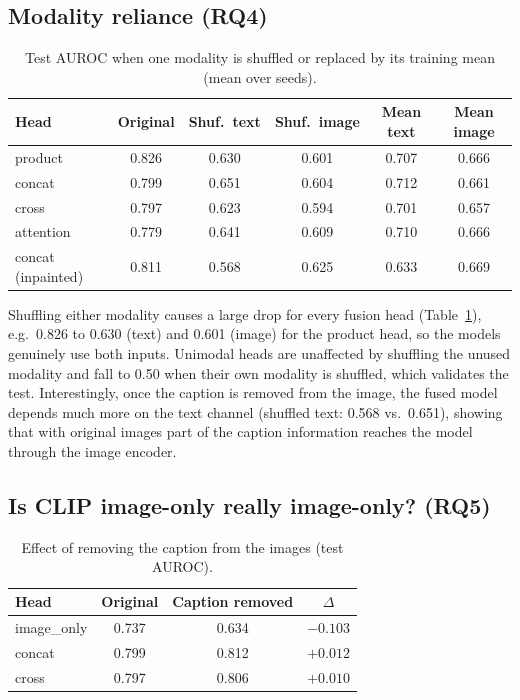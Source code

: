 \documentclass[conference]{IEEEtran}
\begin{document}
\subsection{Modality reliance (RQ4)}
\begin{table}[t]
\centering
\caption{Test AUROC when one modality is shuffled or replaced by its training mean (mean over seeds).}
\label{tab:modality}
\setlength{\tabcolsep}{3pt}
\begin{tabular}{lccccc}
\toprule
Head & Original & Shuf.\ text & Shuf.\ image & Mean text & Mean image \\
\midrule
product & 0.826 & 0.630 & 0.601 & 0.707 & 0.666 \\
concat & 0.799 & 0.651 & 0.604 & 0.712 & 0.661 \\
cross & 0.797 & 0.623 & 0.594 & 0.701 & 0.657 \\
attention & 0.779 & 0.641 & 0.609 & 0.710 & 0.666 \\
concat (inpainted) & 0.811 & 0.568 & 0.625 & 0.633 & 0.669 \\
\bottomrule
\end{tabular}
\end{table}

Shuffling either modality causes a large drop for every fusion head (Table~\ref{tab:modality}), e.g.\ 0.826 to 0.630
(text) and 0.601 (image) for the product head, so the models genuinely use both inputs. Unimodal heads are unaffected
by shuffling the unused modality and fall to 0.50 when their own modality is shuffled, which validates the test.
Interestingly, once the caption is removed from the image, the fused model depends much more on the text channel
(shuffled text: 0.568 vs.\ 0.651), showing that with original images part of the caption information reaches the
model through the image encoder.

\subsection{Is CLIP image-only really image-only? (RQ5)}
\begin{table}[t]
\centering
\caption{Effect of removing the caption from the images (test AUROC).}
\label{tab:inpaint}
\begin{tabular}{lccc}
\toprule
Head & Original & Caption removed & $\Delta$ \\
\midrule
image\_only & 0.737 & 0.634 & $-0.103$ \\
concat & 0.799 & 0.812 & $+0.012$ \\
cross & 0.797 & 0.806 & $+0.010$ \\
\bottomrule
\end{tabular}
\end{table}
\end{document}
